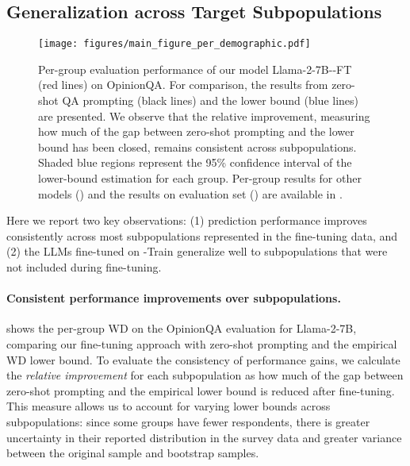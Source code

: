 \subsection{Generalization across Target Subpopulations}
\label{section_experiments_per_group}
\begin{figure*}[!t]
    \centering
    \captionsetup{font=small}
    \texttt{[image: figures/main\_figure\_per\_demographic.pdf]}
    \caption{
    Per-group evaluation performance of our model Llama-2-7B-\OURDATA-FT (red lines) on OpinionQA.
    For comparison, the results from zero-shot QA prompting (black lines)
    and the lower bound (blue lines) are presented.
    We observe that the relative improvement,
    measuring how much of the gap between zero-shot prompting and the lower bound has been closed,
    remains consistent across subpopulations.
    Shaded blue regions represent the 95\% confidence interval of the lower-bound estimation for each group.
    Per-group results for other models ()
    and the results on \OURDATA evaluation set () are available in .
    \label{fig:per_group_results}
    }
\end{figure*}

Here we report two key observations: 
(1) prediction performance improves consistently across most subpopulations represented in the fine-tuning data, and 
(2) the LLMs fine-tuned on \OURDATA-Train generalize well to subpopulations that were not included during fine-tuning.

\paragraph{Consistent performance improvements over subpopulations.}
 shows the per-group WD on the OpinionQA evaluation for Llama-2-7B, 
comparing our fine-tuning approach with zero-shot prompting and the empirical WD lower bound. 
To evaluate the consistency of performance gains, we calculate the \textit{relative improvement} for each subpopulation as how much of the gap between zero-shot prompting and the empirical lower bound is reduced after fine-tuning. 
This measure allows us to account for varying lower bounds across subpopulations: since some groups have fewer respondents, there is greater uncertainty in their reported distribution in the survey data and greater variance between the original sample and bootstrap samples.

